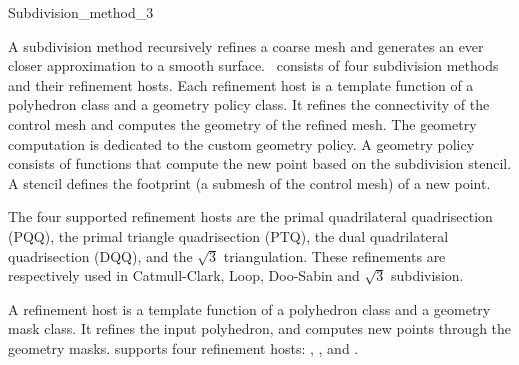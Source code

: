 
\ccRefPageBegin



\begin{ccRefClass}{Subdivision_method_3}

\ccDefinition

A subdivision method recursively refines a coarse mesh and 
generates an ever closer approximation to a smooth surface.
\ccClassTemplateName\ consists of four subdivision methods
and their refinement hosts. Each refinement host is a template 
function of a polyhedron class and a 
geometry policy class. It refines the connectivity of the
control mesh and computes the geometry of the refined mesh.
The geometry computation is dedicated to the custom
geometry policy. A geometry policy consists of functions 
that compute the new point based on the subdivision stencil.
A stencil defines the footprint (a submesh of the control mesh)
of a new point.

The four supported refinement hosts are the 
primal quadrilateral quadrisection (PQQ),
the primal triangle quadrisection (PTQ), 
the dual quadrilateral quadrisection (DQQ), 
and the $\sqrt{3}$ triangulation.
These refinements are respectively used in 
Catmull-Clark, Loop, Doo-Sabin and $\sqrt{3}$ subdivision.


A refinement host is a template function of 
a polyhedron class and a geometry mask class. It refines
the input polyhedron, and computes new points through 
the geometry masks.
 supports four refinement hosts:
, ,  and .


\end{ccRefClass}
